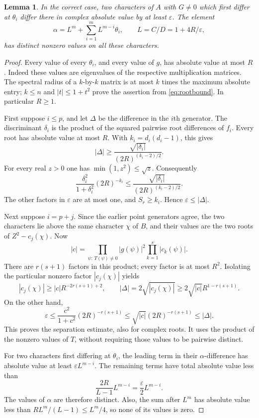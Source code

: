 \documentclass[11pt,a4paper]{article}
\newtheorem{lemma}[theorem]{Lemma}
\begin{document}
\begin{lemma}\label{lem:separate}
In the correct case, two characters of $A$ with $G\ne0$
which first differ at $\theta_i$ differ there in complex absolute
value by at least $\varepsilon$. The element
\[
 \alpha=L^m+\sum_{i=1}^mL^{m-i}\theta_i,
                 \qquad L=C/D=1+4R/\varepsilon,
\]
has distinct nonzero values on all these characters.
\end{lemma}
\begin{proof}
Every value of every $\theta_i$, and every value of $g$, has
absolute value at most $R$. Indeed these values are eigenvalues
of the respective multiplication matrices. The spectral radius
of a $k$-by-$k$ matrix is at most $k$ times the maximum absolute
entry; $k\le n$ and $|t|\le1+t^2$ prove the assertion from
\eqref{eq:rootbound}. In particular $R\ge1$.

First suppose $i\le p$, and let $\Delta$ be the difference
in the $i$th generator. The discriminant $\delta_i$ is the
product of the squared pairwise root differences of $f_i$.
Every root has absolute value at most $R$. With
$k_i=d_i(d_i-1)$, this gives
\[
 |\Delta|\ge\frac{\sqrt{|\delta_i|}}{(2R)^{(k_i-2)/2}}.
\]
For every real $z>0$ one has $\min(1,z^2)\le\sqrt z$.
Consequently
\[
 \frac{\delta_i^2}{1+\delta_i^2}(2R)^{-k_i}
 \le\frac{\sqrt{|\delta_i|}}{(2R)^{(k_i-2)/2}}.
\]
The other factors in $\varepsilon$ are at most one, and
$S_r\ge k_i$. Hence $\varepsilon\le|\Delta|$.

Next suppose $i=p+j$. Since the earlier point generators agree,
the two characters lie above the same character $\chi$ of $B$,
and their values are the two roots of $Z^2-c_j(\chi)$.
Now
\[
 |c|=\prod_{\psi:\,T(\psi)\ne0}
                  |g(\psi)|^2\prod_{k=1}^s|c_k(\psi)|.
\]
There are $r(s+1)$ factors in this product; every factor is
at most $R^2$. Isolating the particular nonzero factor
$|c_j(\chi)|$ yields
\[
 |c_j(\chi)|\ge |c|R^{-2r(s+1)+2},\qquad
 |\Delta|=2\sqrt{|c_j(\chi)|}
              \ge2\sqrt{|c|}R^{1-r(s+1)}.
\]
On the other hand,
\[
 \varepsilon\le\frac{c^2}{1+c^2}(2R)^{-r(s+1)}
       \le\sqrt{|c|}(2R)^{-r(s+1)}\le|\Delta|.
\]
This proves the separation estimate, also for complex roots.
It uses the product of the nonzero values of $T$, without
requiring those values to be pairwise distinct.

For two characters first differing at $\theta_i$, the leading
term in their $\alpha$-difference has absolute value at least
$\varepsilon L^{m-i}$. The remaining terms have total absolute
value less than
\[
 \frac{2R}{L-1}L^{m-i}=\frac\varepsilon2L^{m-i}.
\]
The values of $\alpha$ are therefore distinct. Also, the sum
after $L^m$ has absolute value less than
$RL^m/(L-1)\le L^m/4$, so none of its values is zero.
\end{proof}
\end{document}
